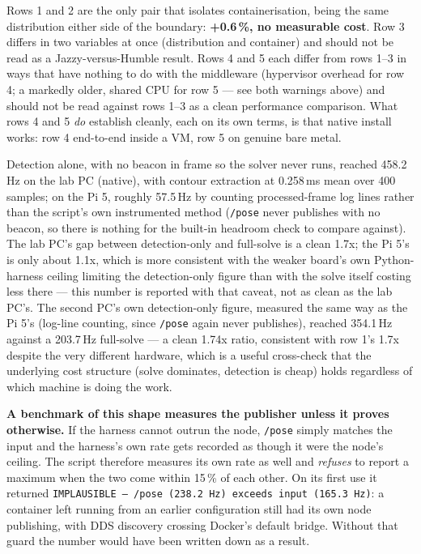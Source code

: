 \documentclass[11pt]{report}
\newenvironment{warningbox}%
  {\begin{lrbox}{\warnbox}\begin{minipage}{0.90\textwidth}}%
  {\end{minipage}\end{lrbox}%
   \begin{center}\fcolorbox{black}{codebg}{\usebox{\warnbox}}\end{center}}
\begin{document}
Rows 1 and 2 are the only pair that isolates containerisation, being the same
distribution either side of the boundary: \textbf{+0.6\,\%, no measurable
cost}. Row 3 differs in two variables at once (distribution and container)
and should not be read as a Jazzy-versus-Humble result. Rows 4 and 5 each
differ from rows 1--3 in ways that have nothing to do with the middleware
(hypervisor overhead for row 4; a markedly older, shared CPU for row 5 ---
see both warnings above) and should not be read against rows 1--3 as a
clean performance comparison. What rows 4 and 5 \emph{do} establish
cleanly, each on its own terms, is that native install works: row 4
end-to-end inside a VM, row 5 on genuine bare metal.

Detection alone, with no beacon in frame so the solver never runs, reached
458.2\,Hz on the lab PC (native), with contour extraction at 0.258\,ms mean
over 400 samples; on the Pi 5, roughly 57.5\,Hz by counting processed-frame
log lines rather than the script's own instrumented method (\texttt{/pose}
never publishes with no beacon, so there is nothing for the built-in
headroom check to compare against). The lab PC's gap between detection-only
and full-solve is a clean 1.7x; the Pi 5's is only about 1.1x, which is more
consistent with the weaker board's own Python-harness ceiling limiting the
detection-only figure than with the solve itself costing less there --- this
number is reported with that caveat, not as clean as the lab PC's. The
second PC's own detection-only figure, measured the same way as the Pi 5's
(log-line counting, since \texttt{/pose} again never publishes), reached
354.1\,Hz against a 203.7\,Hz full-solve --- a clean 1.74x ratio, consistent
with row 1's 1.7x despite the very different hardware, which is a useful
cross-check that the underlying cost structure (solve dominates, detection
is cheap) holds regardless of which machine is doing the work.

\begin{warningbox}
\textbf{A benchmark of this shape measures the publisher unless it proves
otherwise.} If the harness cannot outrun the node, \texttt{/pose} simply
matches the input and the harness's own rate gets recorded as though it were
the node's ceiling. The script therefore measures its own rate as well and
\emph{refuses} to report a maximum when the two come within 15\,\% of each
other. On its first use it returned
\texttt{IMPLAUSIBLE -- /pose (238.2\,Hz) exceeds input (165.3\,Hz)}: a
container left running from an earlier configuration still had its own node
publishing, with DDS discovery crossing Docker's default bridge. Without that
guard the number would have been written down as a result.
\end{warningbox}
\end{document}
